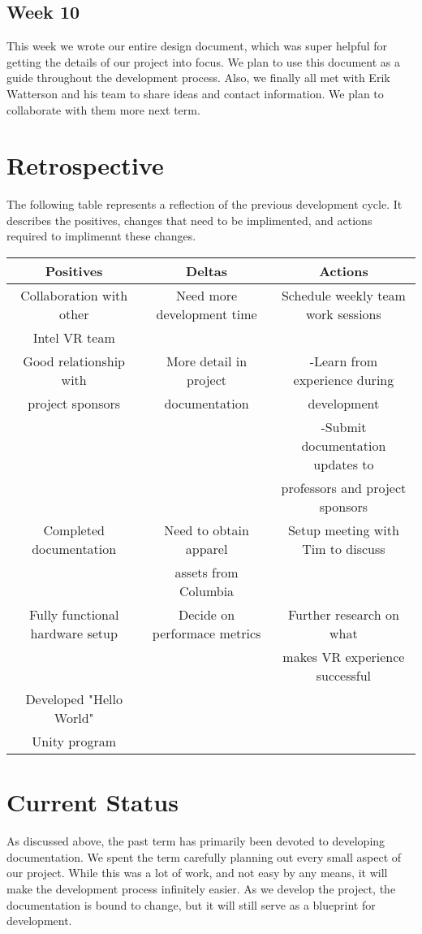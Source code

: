 \documentclass[10pt,journal,compsoc,onecolumn, draftclsnofoot]{IEEEtran}
\begin{document}
\subsection{Week 10}
This week we wrote our entire design document, which was super helpful for getting the details of our project into focus.
We plan to use this document as a guide throughout the development process.
Also, we finally all met with Erik Watterson and his team to share ideas and contact information.
We plan to collaborate with them more next term.

\section{Retrospective}
The following table represents a reflection of the previous development cycle.
It describes the positives, changes that need to be implimented, and actions required to implimennt these changes.

\begin{center}
\begin{tabular}{ |c || c | c | }
 \hline
 Positives & Deltas & Actions \\
 \hline \hline
 Collaboration with other & Need more development time & Schedule weekly team work sessions\\
 Intel VR team & & \\ \hline
 Good relationship with & More detail in project & -Learn from experience during \\ project sponsors & documentation & development \\
 & & -Submit documentation updates to \\
 & & professors and project sponsors\\ \hline
 Completed documentation & Need to obtain apparel & Setup meeting with Tim to discuss\\
 & assets from Columbia & \\ \hline
 Fully functional hardware setup & Decide on performace metrics & Further research on what\\
 & & makes VR experience successful\\ \hline
 Developed "Hello World" & & \\
 Unity program & & \\
 \hline
\end{tabular}
\end{center}
\section{Current Status}
As discussed above, the past term has primarily been devoted to developing documentation.
We spent the term carefully planning out every small aspect of our project.
While this was a lot of work, and not easy by any means, it will make the development process infinitely easier.
As we develop the project, the documentation is bound to change, but it will still serve as a blueprint for development.
\end{document}
